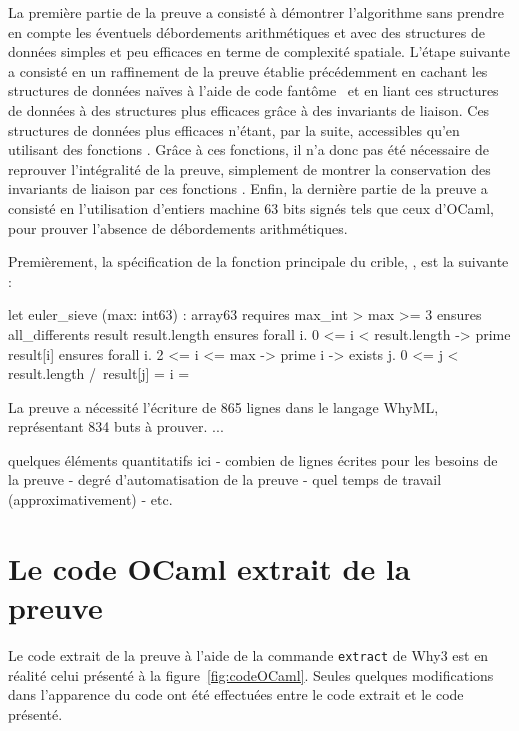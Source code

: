 \documentclass[a4paper]{easychair}
\begin{document}
La première partie de la preuve a consisté à démontrer l'algorithme sans prendre
en compte les éventuels débordements arithmétiques et avec des structures
de données simples et peu efficaces en terme de complexité spatiale.
L'étape suivante a consisté en un raffinement de la preuve établie précédemment
en cachant les structures de données naïves à l'aide de code
fantôme~\cite{ghost-code} et en liant ces structures de données à des structures
plus efficaces grâce à des invariants de liaison. Ces structures de données plus
efficaces n'étant, par la suite, accessibles qu'en utilisant des fonctions
. Grâce à ces fonctions, il n'a donc pas été
nécessaire de reprouver l'intégralité de la preuve, simplement de montrer la
conservation des invariants de liaison par ces fonctions .
Enfin, la dernière partie de la preuve a consisté en l'utilisation d'entiers
machine 63 bits signés tels que ceux d'OCaml, pour prouver l'absence de
débordements arithmétiques.

Premièrement, la spécification de la fonction principale du crible,
, est la suivante :

\begin{why3}
let euler_sieve (max: int63) : array63
  requires { max_int > max >= 3                                    }
  ensures  { all_differents result result.length                   }
  ensures  { forall i. 0 <= i < result.length -> prime result[i]        }
  ensures  { forall i. 2 <= i <= max -> prime i ->
                       exists j. 0 <= j < result.length /\ result[j] = i }
=
\end{why3}

La preuve a nécessité l'écriture de 865 lignes dans le langage WhyML,
représentant 834 buts à prouver.
...

quelques éléments quantitatifs ici
- combien de lignes écrites pour les besoins de la preuve
- degré d'automatisation de la preuve
- quel temps de travail (approximativement)
- etc.

\section{Le code OCaml extrait de la preuve}

Le code extrait de la preuve à l'aide de la commande \texttt{extract} de Why3
est en réalité celui présenté à la figure~\ref{fig:codeOCaml}.
Seules quelques modifications dans l'apparence du code ont été effectuées
entre le code extrait et le code présenté.
\end{document}
